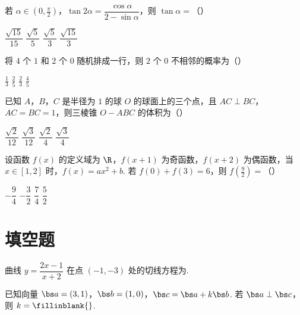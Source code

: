 \begin{problem}
若 \(\alpha\in \left( 0,\frac{\pi}{2} \right)\)，\(\tan 2\alpha=\dfrac{\cos \alpha}{2-\sin \alpha}\)，则 \(\tan \alpha=\)（\quad）

\choices
    {\(\dfrac{\sqrt{15}}{15}\)}
    {\(\dfrac{\sqrt{5}}{5}\)}
    {\(\dfrac{\sqrt{5}}{3}\)}
    {\(\dfrac{\sqrt{15}}{3}\)}

\end{problem}

\begin{problem}
将 \(4\) 个 \(1\) 和 \(2\) 个 \(0\) 随机排成一行，则 \(2\) 个 \(0\) 不相邻的概率为（\quad）

\choices
    {\(\frac{1}{3}\)}
    {\(\frac{2}{5}\)}
    {\(\frac{2}{3}\)}
    {\(\frac{4}{5}\)}

\end{problem}

\begin{problem}
已知 \(A\)，\(B\)，\(C\) 是半径为 \(1\) 的球 \(O\) 的球面上的三个点，且 \(AC\perp BC\)，\(AC=BC=1\)，则三棱锥 \(O-ABC\) 的体积为（\quad）

\choices
    {\(\dfrac{\sqrt{2}}{12}\)}
    {\(\dfrac{\sqrt{3}}{12}\)}
    {\(\dfrac{\sqrt{2}}{4}\)}
    {\(\dfrac{\sqrt{3}}{4}\)}

\end{problem}

\begin{problem}
设函数 \(f(x)\) 的定义域为 \(\R\)，\(f(x+1)\) 为奇函数，\(f(x+2)\) 为偶函数，当 \(x\in [1,2]\) 时，\(f(x)=ax^2+b\). 若 \(f(0)+f(3)=6\)，则 \(f\left( \frac{9}{2} \right)=\)（\quad）

\choices
    {\(-\dfrac{9}{4}\)}
    {\(-\dfrac{3}{2}\)}
    {\(\dfrac{7}{4}\)}
    {\(\dfrac{5}{2}\)}

\end{problem}

\section{填空题}

\begin{problem}
曲线 \(y=\dfrac{2x-1}{x+2}\) 在点 \((-1,-3)\) 处的切线方程为\fillinblank{}.

\end{problem}

\begin{problem}
已知向量 \(\bs a=(3,1)\)，\(\bs b=(1,0)\)，\(\bs c=\bs a+k\bs b\). 若 \(\bs a\perp \bs c\)，则 \(k=\fillinblank{}\).

\end{problem}

